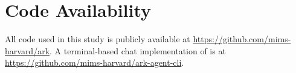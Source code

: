 \section{Code Availability}

All code used in this study is publicly available at \url{https://github.com/mims-harvard/ark}. A terminal-based chat implementation of \retrieverShort is at \url{https://github.com/mims-harvard/ark-agent-cli}.